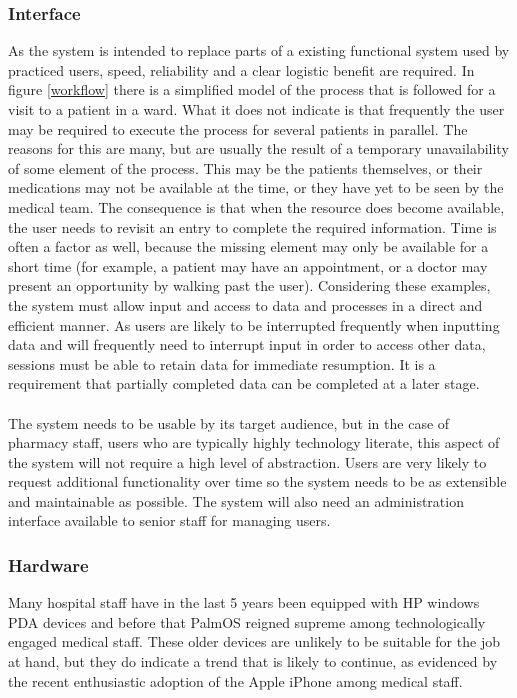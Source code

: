 \documentclass[letterpaper]{amsart}
\begin{document}
\subsubsection{Interface} As the system is intended to replace parts of a existing functional system used by practiced users, speed, reliability and a clear logistic benefit are required.  In  figure \ref{workflow} there is a simplified model of the process that is followed for a visit to a patient in a ward.  What it does not indicate is that frequently the user may be required to execute the process for several patients in parallel.  The reasons for this are many, but are usually the result of a temporary unavailability of some element of the process.  This may be the patients themselves, or their medications may not be available at the time, or they have yet to be seen by the medical team.  The consequence is that when the resource does become available, the user needs to revisit an entry to complete the required information.  Time is often a factor as well, because the missing element may only be available for a short time (for example, a patient may have an appointment, or a doctor may present an opportunity by walking past the user).  Considering these examples, the system must allow input and access to data and processes in a direct and efficient manner. As users are likely to be interrupted frequently when inputting data and will frequently need to interrupt input in order to access other data, sessions must be able to retain data for immediate resumption. It is a requirement that partially completed data can be completed at a later stage.\\
\paragraph{ } The system needs to be usable by its target audience, but in the case of pharmacy staff, users who are typically highly technology literate, this aspect of the system will not require a high level of abstraction. Users are very likely to request additional functionality over time so the system needs to be as extensible and maintainable as possible. The system will also need an administration interface available to senior staff for managing users.  

\subsubsection{Hardware} Many hospital staff have in the last 5 years been equipped with HP windows PDA devices and before that PalmOS reigned supreme among technologically engaged medical staff.  These older devices are unlikely to be suitable for the job at hand, but they do indicate a trend that is likely to continue, as evidenced by the recent enthusiastic adoption of the Apple iPhone among medical staff\cite{skyscapeiphone}. 
\end{document}
